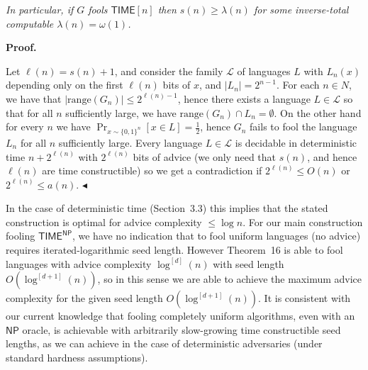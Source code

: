 \emph{In particular, if $G$ fools ${\mathsf{TIME}}[n]$ then $s(n)\geq\lambda(n)$ for some inverse-total computable $\lambda(n)=\omega(1)$.}\par






\par\medskip\noindent\textbf{Proof.}\par




Let $\ell(n)=s(n)+1$, and consider the family $\mathcal{L}$ of languages $L$ with $L_{n}(x)$ depending only on the first $\ell(n)$ bits of $x$, and $|L_{n}|=2^{n-1}$.
For each $n\in N$, we have that $|\mathrm{range}(G_{n})|\leq 2^{\ell(n)-1}$, hence there exists a language $L\in\mathcal{L}$ so that for all $n$ sufficiently large, we have $\mathrm{range}(G_{n})\cap L_{n}=\emptyset$. On the other hand for every $n$ we have $\Pr_{x\sim\{0,1\}^{n}}[x\in L]=\frac{1}{2}$, hence $G_{n}$ fails to fool the language $L_{n}$ for all $n$ sufficiently large. Every language $L\in\mathcal{L}$ is decidable in deterministic time $n+2^{\ell(n)}$ with $2^{\ell(n)}$ bits of advice (we only need that $s(n)$, and hence $\ell(n)$ are time constructible) so we get a contradiction if $2^{\ell(n)}\leq O(n)$ or $2^{\ell(n)}\leq a(n)$.
$\blacktriangleleft$\par




In the case of deterministic time (Section 3.3) this implies that the stated construction is optimal for advice complexity $\leq\log n$. For our main construction fooling ${\mathsf{TIME}}^{{\mathsf{NP}}}$, we have no indication that to fool uniform languages (no advice) requires iterated-logarithmic seed length. However Theorem 16 is able to fool languages with advice complexity $\log^{[d]}(n)$ with seed length $O(\log^{[d+1]}(n))$, so in this sense we are able to achieve the maximum advice complexity for the given seed length $O(\log^{[d+1]}(n))$. It is consistent with our current knowledge that fooling completely uniform algorithms, even with an ${\mathsf{NP}}$ oracle, is achievable with arbitrarily slow-growing time constructible seed lengths, as we can achieve in the case of deterministic adversaries (under standard hardness assumptions).\par







